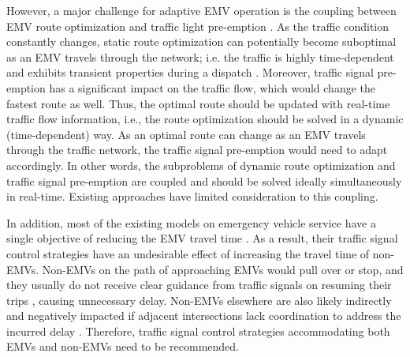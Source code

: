 However, a major challenge for adaptive EMV operation is the coupling between
EMV route optimization and traffic light pre-emption \cite{humagain2020systematic}. As the traffic condition constantly changes, static route optimization can potentially become suboptimal as an EMV travels through the network; i.e. the traffic is highly time-dependent and exhibits transient properties during a dispatch \cite{Coogan2015Compartmental}. Moreover, traffic signal pre-emption has a significant impact on the traffic flow, which would change the fastest route as well. Thus, the optimal route should be updated with real-time traffic flow information, i.e., the route optimization should be solved in a dynamic (time-dependent) way. As an optimal route can change as an EMV travels through the traffic network, the traffic signal pre-emption would need to adapt accordingly. In other words, the subproblems of dynamic route optimization and traffic signal pre-emption are coupled and should be solved ideally simultaneously in real-time. Existing approaches have limited consideration to this coupling.

%
In addition, most of the existing models on emergency vehicle service have a single objective of reducing the EMV travel time \cite{Haghani2004Simulation, haghani2003optimization, panahi2008gis, shaaban2019strategy}. As a result, their traffic signal control strategies have an undesirable effect of increasing the travel time of non-EMVs. Non-EMVs on the path of approaching EMVs would pull over or stop, and they usually do not receive clear guidance from traffic signals on resuming their trips \cite{hsiao2018preventing}, causing unnecessary delay. Non-EMVs elsewhere are also likely indirectly and negatively impacted if adjacent intersections lack coordination to address the incurred delay \cite{humagain2020systematic}. Therefore, traffic signal control strategies accommodating both EMVs and non-EMVs need to be recommended.

